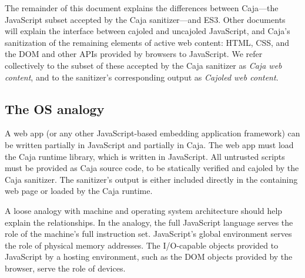 \documentclass[letterpaper,twocolumn,10pt]{article}
\begin{document}
The remainder of this document explains the differences between Caja---the 
JavaScript subset accepted by the Caja sanitizer---and ES3. Other documents 
will explain the interface between cajoled and uncajoled JavaScript, and 
Caja's sanitization of the remaining elements of active web content: HTML, 
CSS, and the DOM and other APIs provided by browsers to JavaScript. We refer 
collectively to the subset of these accepted by the Caja sanitizer as 
\emph{Caja web content}, and to the sanitizer's corresponding output as 
\emph{Cajoled web content}.

\subsection{The OS analogy}
\label{subsec:os-analog}

A web app (or any other JavaScript-based embedding application framework) can 
be written partially in JavaScript and partially in Caja. The web app must load 
the Caja runtime library, which is written in JavaScript. All 
untrusted scripts must be provided as Caja source code, to be statically 
verified and cajoled by the Caja sanitizer. The sanitizer's output is 
either included directly in the containing web page or loaded by the Caja 
runtime.

A loose analogy with machine and operating system architecture should help 
explain the relationships. In the analogy, the full JavaScript language 
serves the role of the machine's full instruction set. JavaScript's global 
environment serves the role of physical memory addresses. The I/O-capable 
objects provided to JavaScript by a hosting environment, such as the DOM 
objects provided by the browser, serve the role of devices.
\end{document}
